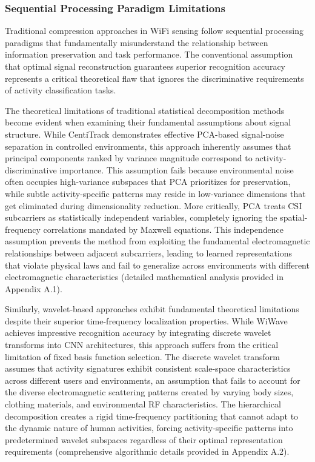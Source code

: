 \documentclass[journal]{IEEEtran}
\begin{document}
\subsubsection{Sequential Processing Paradigm Limitations}

Traditional compression approaches in WiFi sensing follow sequential processing paradigms that fundamentally misunderstand the relationship between information preservation and task performance. The conventional assumption that optimal signal reconstruction guarantees superior recognition accuracy represents a critical theoretical flaw that ignores the discriminative requirements of activity classification tasks.

The theoretical limitations of traditional statistical decomposition methods become evident when examining their fundamental assumptions about signal structure. While CentiTrack \cite{han2023centitrack} demonstrates effective PCA-based signal-noise separation in controlled environments, this approach inherently assumes that principal components ranked by variance magnitude correspond to activity-discriminative importance. This assumption fails because environmental noise often occupies high-variance subspaces that PCA prioritizes for preservation, while subtle activity-specific patterns may reside in low-variance dimensions that get eliminated during dimensionality reduction. More critically, PCA treats CSI subcarriers as statistically independent variables, completely ignoring the spatial-frequency correlations mandated by Maxwell equations. This independence assumption prevents the method from exploiting the fundamental electromagnetic relationships between adjacent subcarriers, leading to learned representations that violate physical laws and fail to generalize across environments with different electromagnetic characteristics (detailed mathematical analysis provided in Appendix A.1).

Similarly, wavelet-based approaches exhibit fundamental theoretical limitations despite their superior time-frequency localization properties. While WiWave \cite{mei2021wiwave} achieves impressive recognition accuracy by integrating discrete wavelet transforms into CNN architectures, this approach suffers from the critical limitation of fixed basis function selection. The discrete wavelet transform assumes that activity signatures exhibit consistent scale-space characteristics across different users and environments, an assumption that fails to account for the diverse electromagnetic scattering patterns created by varying body sizes, clothing materials, and environmental RF characteristics. The hierarchical decomposition creates a rigid time-frequency partitioning that cannot adapt to the dynamic nature of human activities, forcing activity-specific patterns into predetermined wavelet subspaces regardless of their optimal representation requirements (comprehensive algorithmic details provided in Appendix A.2).
\end{document}
